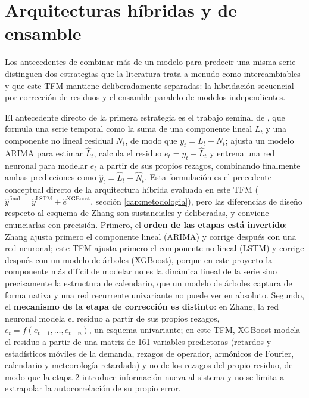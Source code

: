 \section{Arquitecturas híbridas y de ensamble}\label{sec:arquitecturas_hibridas}

Los antecedentes de combinar más de un modelo para predecir una misma serie distinguen
dos estrategias que la literatura trata a menudo como intercambiables y que este TFM
mantiene deliberadamente separadas: la hibridación secuencial por corrección de residuos
y el ensamble paralelo de modelos independientes.

El antecedente directo de la primera estrategia es el trabajo seminal de
\textcite{zhang2003hybrid}, que formula una serie temporal como la suma de una componente
lineal $L_t$ y una componente no lineal residual $N_t$, de modo que
$y_t = L_t + N_t$; ajusta un modelo ARIMA para estimar $\hat L_t$, calcula el residuo
$e_t = y_t - \hat L_t$ y entrena una red neuronal para modelar $e_t$ a partir de sus
propios rezagos, combinando finalmente ambas predicciones como
$\hat y_t = \hat L_t + \hat N_t$. Esta formulación es el precedente conceptual directo de la arquitectura híbrida evaluada
en este TFM ($\hat y^{\text{final}} = \hat y^{\text{LSTM}} + \hat e^{\text{XGBoost}}$,
sección \ref{cap:metodologia}), pero las diferencias de diseño respecto al esquema de
Zhang son sustanciales y deliberadas, y conviene enunciarlas con precisión. Primero, el
\textbf{orden de las etapas está invertido}: Zhang ajusta primero el componente lineal
(ARIMA) y corrige después con una red neuronal; este TFM ajusta primero el componente no
lineal (LSTM) y corrige después con un modelo de árboles (XGBoost), porque en este
proyecto la componente más difícil de modelar no es la dinámica lineal de la serie sino
precisamente la estructura de calendario, que un modelo de árboles captura de forma nativa
y una red recurrente univariante no puede ver en absoluto. Segundo, el \textbf{mecanismo
de la etapa de corrección es distinto}: en Zhang, la red neuronal modela el residuo a
partir de sus propios rezagos, $e_t = f(e_{t-1}, \ldots, e_{t-n})$, un esquema
univariante; en este TFM, XGBoost modela el residuo a partir de una matriz de 161
variables predictoras (retardos y estadísticos móviles de la demanda, rezagos de operador,
armónicos de Fourier, calendario y meteorología retardada) y no de los rezagos del propio
residuo, de modo que la etapa 2 introduce información nueva al sistema y no se limita a
extrapolar la autocorrelación de su propio error.

